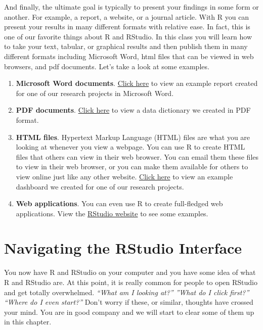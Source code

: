 \documentclass[
  letterpaper,
  DIV=11,
  numbers=noendperiod]{scrreprt}
\providecommand{\tightlist}{%
  \setlength{\itemsep}{0pt}\setlength{\parskip}{0pt}}\usepackage{longtable,booktabs,array}
\begin{document}
And finally, the ultimate goal is typically to present your findings in
some form or another. For example, a report, a website, or a journal
article. With R you can present your results in many different formats
with relative ease. In fact, this is one of our favorite things about R
and RStudio. In this class you will learn how to take your text,
tabular, or graphical results and then publish them in many different
formats including Microsoft Word, html files that can be viewed in web
browsers, and pdf documents. Let's take a look at some examples.

\begin{enumerate}
\def\labelenumi{\arabic{enumi}.}
\tightlist
\item
  \textbf{Microsoft Word documents}.
  \href{https://www.dropbox.com/s/6l1ikp6wbyue9bd/chap_2_example_word_docI.docx?dl=0}{Click
  here} to view an example report created for one of our research
  projects in Microsoft Word.\\
\item
  \textbf{PDF documents}.
  \href{https://www.dropbox.com/s/hheuyv5qcabf197/chap_2_example_pdf.pdf?dl=0}{Click
  here} to view a data dictionary we created in PDF format.\\
\item
  \textbf{HTML files}. Hypertext Markup Language (HTML) files are what
  you are looking at whenever you view a webpage. You can use R to
  create HTML files that others can view in their web browser. You can
  email them these files to view in their web browser, or you can make
  them available for others to view online just like any other website.
  \href{https://brad-cannell.github.io/detect_recruitment_dashboard/}{Click
  here} to view an example dashboard we created for one of our research
  projects.\\
\item
  \textbf{Web applications}. You can even use R to create full-fledged
  web applications. View the
  \href{https://shiny.rstudio.com/gallery/}{RStudio website} to see some
  examples.
\end{enumerate}

\chapter{Navigating the RStudio
Interface}\label{navigating-the-rstudio-interface}

You now have R and RStudio on your computer and you have some idea of
what R and RStudio are. At this point, it is really common for people to
open RStudio and get totally overwhelmed. \emph{``What am I looking
at?''} \emph{''What do I click first?''} \emph{``Where do I even
start?''} Don't worry if these, or similar, thoughts have crossed your
mind. You are in good company and we will start to clear some of them up
in this chapter.
\end{document}
